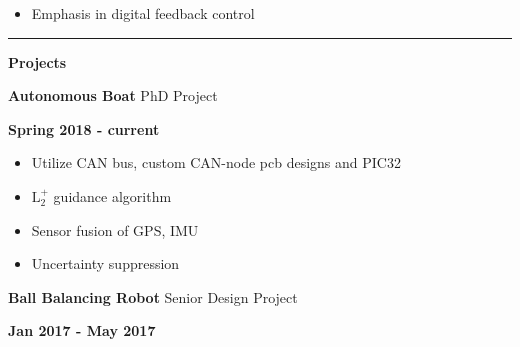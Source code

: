 \documentclass[paper=a4,fontsize=11pt]{article} %
\def \sectionSpace   {0.009\textheight} %
\def \leftColSpace      {0.1\textwidth} %
\def \middleColSpace    {0.75\textwidth}%
\def \bigMiddleColSpace {0.8\textwidth} %
\def \rightColSpace {0.25\textwidth}    %
\def \lineThickness {1pt}               %
\begin{document}
    \noindent
    \begin{minipage}[t]{\leftColSpace}
        \hfill
    \end{minipage}
    \begin{minipage}[t]{\bigMiddleColSpace}
        \begin{itemize}[noitemsep,topsep=0pt]
            \item Emphasis in digital feedback control
        \end{itemize}
    \end{minipage}
    \vspace{-0.275cm}

    \vspace{\sectionSpace}
    \noindent\rule{\textwidth}{\lineThickness}

    \noindent
    \begin{minipage}[t]{\leftColSpace}
        \noindent \textbf{Projects}
    \end{minipage}
    \begin{minipage}[t]{\middleColSpace}
        \noindent \textbf{Autonomous Boat} \quad PhD Project
    \end{minipage}
    \begin{minipage}[t]{\rightColSpace}
        \noindent \textbf{Spring 2018 - current}
    \end{minipage}

    \noindent
    \begin{minipage}[t]{\leftColSpace}
        \hfill
    \end{minipage}
    \begin{minipage}[t]{\bigMiddleColSpace}
        \begin{itemize}[noitemsep,topsep=0pt]
        \item Utilize CAN bus, custom CAN-node pcb designs and PIC32
        \item $\text{L}_2^+$ guidance algorithm
        \item Sensor fusion of GPS, IMU
        \item Uncertainty suppression
        \end{itemize}
    \end{minipage}

    \vspace{\sectionSpace}
    \noindent
    \begin{minipage}[t]{\leftColSpace}
        \noindent \hfill
    \end{minipage}
    \begin{minipage}[t]{\middleColSpace}
        \noindent \textbf{Ball Balancing Robot } \quad Senior Design Project
    \end{minipage}
    \begin{minipage}[t]{\rightColSpace}
        \noindent \textbf{Jan 2017 - May 2017}
    \end{minipage}
\end{document}
